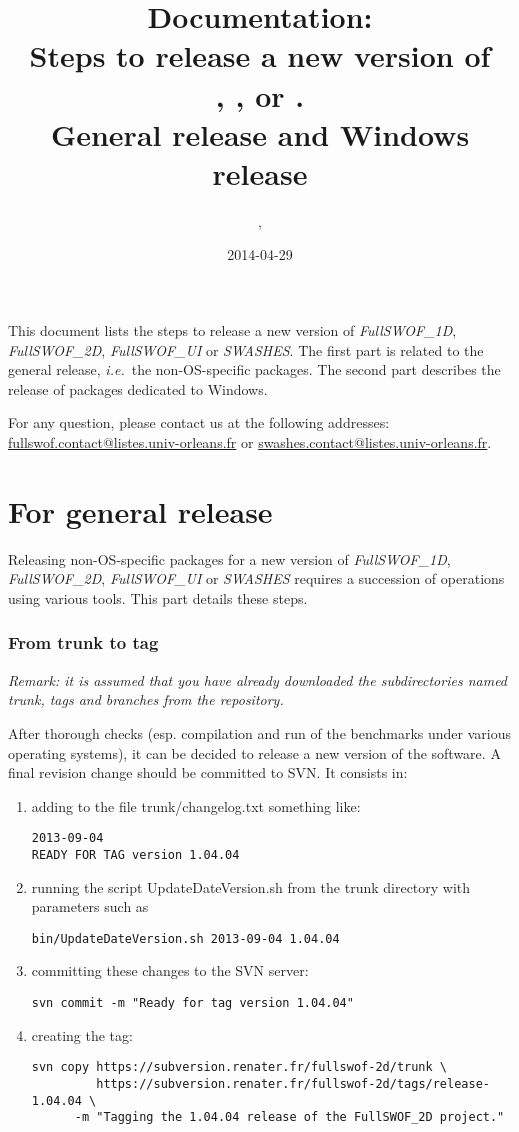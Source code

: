 \documentclass[a4paper, 11pt]{article}
\title{Documentation:\\
Steps to release a new version of\\
\FullSWOFoneD, \FullSWOFtwoD{}, \FullSWOFUI{} or \SWASHES{}.\\
General release and Windows release}
\author{\contactFullName, \contactEmail}
\date{2014-04-29}
\makeatletter
\newcommand{\FullSWOFoneD}{\emph{FullSWOF\_1D}}
\newcommand{\FullSWOFtwoD}{\emph{FullSWOF\_2D}}
\newcommand{\FullSWOFUI}{\emph{FullSWOF\_UI}}
\newcommand{\SWASHES}{\emph{SWASHES}}
\newcommand{\contactFS}{\href{mailto:fullswof.contact@listes.univ-orleans.fr}{fullswof.contact@listes.univ-orleans.fr}}
\newcommand{\contactSWASHES}{\href{mailto:swashes.contact@listes.univ-orleans.fr}{swashes.contact@listes.univ-orleans.fr}}
\makeatother
\begin{document}
\maketitle

\thispagestyle{fancy}

This document lists the steps to release a new version of \FullSWOFoneD, \FullSWOFtwoD{}, \FullSWOFUI{} or \SWASHES{}. The first part is related to the general release, \emph{i.e.}~the non-OS-specific packages. The second part describes the release of packages dedicated to Windows.

For any question, please contact us at the following addresses: \contactFS{} or \contactSWASHES{}.

\part{For general release}

Releasing non-OS-specific packages for a new version of \FullSWOFoneD, \FullSWOFtwoD{}, \FullSWOFUI{} or \SWASHES{} requires a succession of operations using various tools. 
This part details these steps.


\section{From trunk to tag}

\emph{Remark: it is assumed that you have already downloaded the subdirectories named trunk, tags and branches from the repository.}

After thorough checks (esp. compilation and run of the benchmarks under various operating systems), it can be decided to release a new version of the software. A final revision change should be committed to SVN. It consists in: 
\begin{enumerate}
\item adding to the file trunk/changelog.txt something like:
\begin{verbatim}
2013-09-04
READY FOR TAG version 1.04.04
\end{verbatim}
\item running the script UpdateDateVersion.sh  from the trunk directory with parameters such as
\begin{verbatim}
bin/UpdateDateVersion.sh 2013-09-04 1.04.04
\end{verbatim}
\item committing these changes to the SVN server:
\begin{verbatim}
svn commit -m "Ready for tag version 1.04.04"
\end{verbatim}
\item creating the tag:
\begin{verbatim}
svn copy https://subversion.renater.fr/fullswof-2d/trunk \
         https://subversion.renater.fr/fullswof-2d/tags/release-1.04.04 \
      -m "Tagging the 1.04.04 release of the FullSWOF_2D project."
\end{verbatim}
\end{enumerate}
\end{document}
